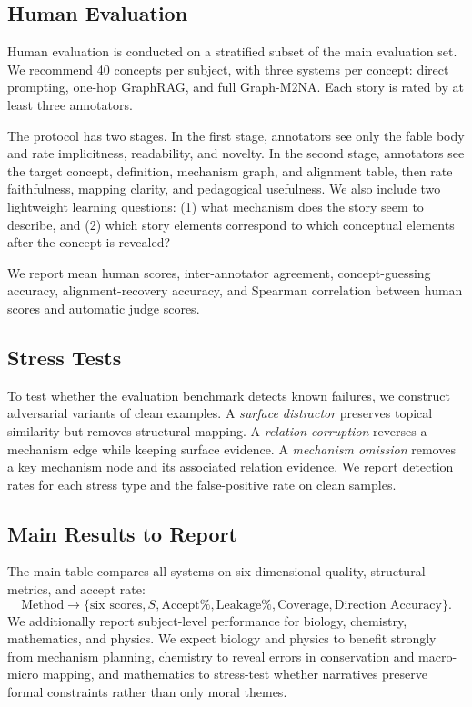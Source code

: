 \documentclass[letterpaper]{article} %
\begin{document}
\subsection{Human Evaluation}

Human evaluation is conducted on a stratified subset of the main evaluation set. We recommend 40 concepts per subject, with three systems per concept: direct prompting, one-hop GraphRAG, and full Graph-M2NA. Each story is rated by at least three annotators.

The protocol has two stages. In the first stage, annotators see only the fable body and rate implicitness, readability, and novelty. In the second stage, annotators see the target concept, definition, mechanism graph, and alignment table, then rate faithfulness, mapping clarity, and pedagogical usefulness. We also include two lightweight learning questions: (1) what mechanism does the story seem to describe, and (2) which story elements correspond to which conceptual elements after the concept is revealed?

We report mean human scores, inter-annotator agreement, concept-guessing accuracy, alignment-recovery accuracy, and Spearman correlation between human scores and automatic judge scores.

\subsection{Stress Tests}

To test whether the evaluation benchmark detects known failures, we construct adversarial variants of clean examples. A \emph{surface distractor} preserves topical similarity but removes structural mapping. A \emph{relation corruption} reverses a mechanism edge while keeping surface evidence. A \emph{mechanism omission} removes a key mechanism node and its associated relation evidence. We report detection rates for each stress type and the false-positive rate on clean samples.

\subsection{Main Results to Report}

The main table compares all systems on six-dimensional quality, structural metrics, and accept rate:
\[
\text{Method} \rightarrow \{\text{six scores}, S, \text{Accept\%}, \text{Leakage\%}, \text{Coverage}, \text{Direction Accuracy}\}.
\]
We additionally report subject-level performance for biology, chemistry, mathematics, and physics. We expect biology and physics to benefit strongly from mechanism planning, chemistry to reveal errors in conservation and macro-micro mapping, and mathematics to stress-test whether narratives preserve formal constraints rather than only moral themes.
\end{document}
